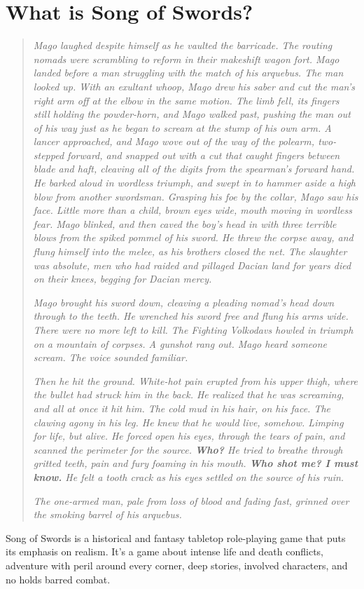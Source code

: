 \documentclass[oneside,11pt,english]{book}
\begin{document}
\section{What is Song of Swords?}
	\begin{quotation}
{\small \emph{Mago laughed despite himself as he vaulted the barricade. The routing nomads were scrambling to reform in their 
makeshift wagon fort. Mago landed before a man struggling with the match of his arquebus. The man looked up. With an exultant whoop, Mago drew his saber and cut the man’s right arm off at the elbow in the same motion. The limb fell, its fingers still holding the powder-horn, and Mago walked past, pushing the man out of his way just as he began to scream at the stump of his own arm. A lancer approached, and Mago wove out of the way of the polearm, two-stepped forward, and snapped out with a cut that caught fingers between blade and haft, cleaving all of the digits from the spearman’s forward hand. He barked aloud in wordless triumph, and swept in to hammer aside a high blow from another swordsman. Grasping his foe by the collar, Mago saw his face. Little more than a child, brown eyes wide, mouth moving in wordless fear. Mago blinked, and then caved the boy’s head in with three terrible blows from the spiked pommel of his sword. He threw the corpse away, and flung himself into the melee, as his brothers closed the net. The slaughter was absolute, men who had raided and pillaged Dacian land for years died on their knees, begging for Dacian mercy.}\par
\emph{Mago brought his sword down, cleaving a pleading nomad’s head down through to the teeth. He wrenched his sword free and flung his arms wide. There were no more left to kill. The Fighting Volkodavs howled in triumph on a mountain of corpses. A gunshot rang out. Mago heard someone scream. The voice sounded familiar.}\par
\emph{Then he hit the ground. White-hot pain erupted from his upper thigh, where the bullet had struck him in the back. He realized that he was screaming, and all at once it hit him. The cold mud in his hair, on his face. The clawing agony in his leg. He knew that he would live, somehow. Limping for life, but alive. He forced open his eyes, through the tears of pain, and scanned the perimeter for the source. \textbf{Who?} He tried to breathe through gritted teeth, pain and fury foaming in his mouth. \textbf{Who shot me? I must know.} He felt a tooth crack as his eyes settled on the source of his ruin.}\par
\emph{The one-armed man, pale from loss of blood and fading fast, grinned over the smoking barrel of his arquebus.}}\par
	\end{quotation}
Song of Swords is a historical and fantasy tabletop role-playing game that puts its emphasis on realism. 
It's a game about intense life and death conflicts, adventure with peril around every corner, deep stories, 
involved characters, and no holds barred combat. 
\end{document}
